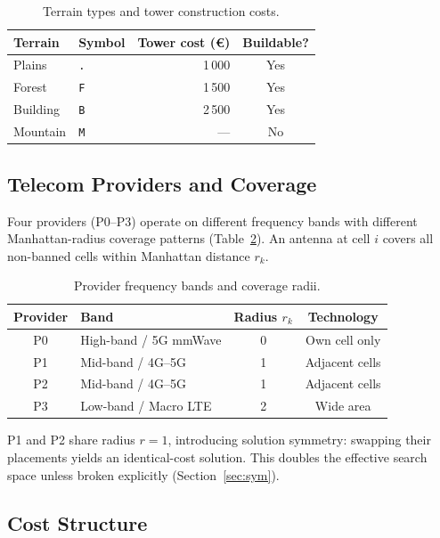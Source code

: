 \documentclass{llncs}
\begin{document}
\begin{table}[H]
\centering
\caption{Terrain types and tower construction costs.}
\label{tab:terrain}
\begin{tabular}{llrc}
\toprule
\textbf{Terrain} & \textbf{Symbol} & \textbf{Tower cost (€)} & \textbf{Buildable?} \\
\midrule
Plains   & \texttt{.} & 1\,000 & Yes \\
Forest   & \texttt{F} & 1\,500 & Yes \\
Building & \texttt{B} & 2\,500 & Yes \\
Mountain & \texttt{M} & ---    & No  \\
\bottomrule
\end{tabular}
\end{table}

\subsection{Telecom Providers and Coverage}

Four providers (P0--P3) operate on different frequency bands with different
Manhattan-radius coverage patterns (Table~\ref{tab:providers}). An antenna at
cell $i$ covers all non-banned cells within Manhattan distance $r_k$.

\begin{table}[H]
\centering
\caption{Provider frequency bands and coverage radii.}
\label{tab:providers}
\begin{tabular}{clcc}
\toprule
\textbf{Provider} & \textbf{Band} & \textbf{Radius $r_k$} & \textbf{Technology} \\
\midrule
P0 & High-band / 5G mmWave & 0 & Own cell only \\
P1 & Mid-band / 4G--5G     & 1 & Adjacent cells \\
P2 & Mid-band / 4G--5G     & 1 & Adjacent cells \\
P3 & Low-band / Macro LTE  & 2 & Wide area \\
\bottomrule
\end{tabular}
\end{table}

P1 and P2 share radius $r{=}1$, introducing solution symmetry: swapping their
placements yields an identical-cost solution. This doubles the effective search
space unless broken explicitly (Section~\ref{sec:sym}).

\subsection{Cost Structure}
\end{document}
